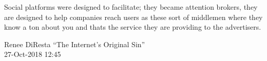 \documentclass[aspectratio=169]{beamer}
\begin{document}
\begin{frame}
\frametitle{}
\epigraph{Social platforms were designed to facilitate; they became attention brokers, they are designed to help companies reach users as these sort of middlemen where they know a ton about you and thats the service they are providing to the advertisers.}{Renee DiResta ``The Internet's Original Sin'' \\ 27-Oct-2018 12:45}

\end{frame}
\end{document}
